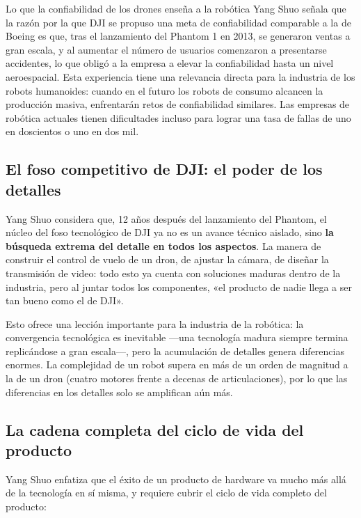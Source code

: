 \begin{importantbox}{Lo que la confiabilidad de los drones enseña a la robótica}
Yang Shuo señala que la razón por la que DJI se propuso una meta de confiabilidad comparable a la de Boeing es que, tras el lanzamiento del Phantom 1 en 2013, se generaron ventas a gran escala, y al aumentar el número de usuarios comenzaron a presentarse accidentes, lo que obligó a la empresa a elevar la confiabilidad hasta un nivel aeroespacial. Esta experiencia tiene una relevancia directa para la industria de los robots humanoides: cuando en el futuro los robots de consumo alcancen la producción masiva, enfrentarán retos de confiabilidad similares. Las empresas de robótica actuales tienen dificultades incluso para lograr una tasa de fallas de uno en doscientos o uno en dos mil.
\end{importantbox}

\subsection{El foso competitivo de DJI: el poder de los detalles}

Yang Shuo considera que, 12 años después del lanzamiento del Phantom, el núcleo del foso tecnológico de DJI ya no es un avance técnico aislado, sino \textbf{la búsqueda extrema del detalle en todos los aspectos}. La manera de construir el control de vuelo de un dron, de ajustar la cámara, de diseñar la transmisión de video: todo esto ya cuenta con soluciones maduras dentro de la industria, pero al juntar todos los componentes, «el producto de nadie llega a ser tan bueno como el de DJI».

Esto ofrece una lección importante para la industria de la robótica: la convergencia tecnológica es inevitable —una tecnología madura siempre termina replicándose a gran escala—, pero la acumulación de detalles genera diferencias enormes. La complejidad de un robot supera en más de un orden de magnitud a la de un dron (cuatro motores frente a decenas de articulaciones), por lo que las diferencias en los detalles solo se amplifican aún más.

\subsection{La cadena completa del ciclo de vida del producto}

Yang Shuo enfatiza que el éxito de un producto de hardware va mucho más allá de la tecnología en sí misma, y requiere cubrir el ciclo de vida completo del producto:

